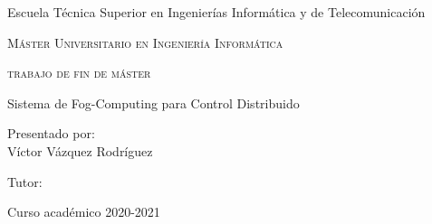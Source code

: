 
\begin{titlepage}
    \AddToShipoutPicture*{\BackgroundPic}

    \begin{addmargin}[2.575cm]{0cm}
        \begin{flushleft}
            \Large
            \hfill\vfil

            \large{\textsf{Escuela Técnica Superior en Ingenierías Informática y de Telecomunicación}}
            \vfill

            {\large\textsc{Máster Universitario en Ingeniería Informática}} \vfill


            {\large\textsc{trabajo de fin de máster}}

            \begingroup
            \Huge{Sistema de Fog-Computing para Control Distribuido}
            \endgroup

            \vfill\vfill\vfill\vfill

            \textsf{\normalsize{Presentado por:}}\\
            {\normalsize\textrm{Víctor Vázquez Rodríguez}}
            \bigskip

            \textsf{\normalsize{Tutor:}}\\
            {\normalsize{}}

            \bigskip
            \textsf{\normalsize{Curso académico 2020-2021}}
        \end{flushleft}
    \end{addmargin}
\end{titlepage}

\cleardoublepage